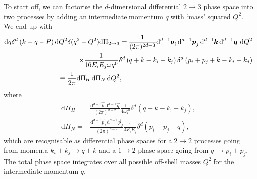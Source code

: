 \documentclass[../main.tex]{subfiles}
\begin{document}
To start off, we can factorise the \(d\)-dimensional differential \(2\to 3\) phase space into two processes by adding an intermediate momentum \(q\) with `mass' squared \(Q^2\).
We end up with
\begin{align}
  \label{pc:eq:dPi_factorised}
  \nonumber
  \mathrm{d}q \delta^d\pclosed{k+q-P} \mathrm{d}Q^2 \delta(q^2-Q^2) \mathrm{d}\Pi_{2\to 3} = \frac{1}{(2\pi)^{2d-3}}\mathrm{d}^{d-1}\vec{p}_i\,\mathrm{d}^{d-1}\vec{p}_j\,\mathrm{d}^{d-1}\vec{k}\,\mathrm{d}^{d-1}\vec{q}\,\,\mathrm{d}Q^2 \\
  \nonumber
  \times \frac{1}{16E_iE_j\omega q^0} \delta^d\pclosed{q+k - k_i-k_j}\delta^d\pclosed{p_i+p_j+k - k_i-k_j}                                                                                                                                  \\
  \equiv \frac{1}{2\pi} \mathrm{d}\Pi_H\, \mathrm{d}\Pi_N\, \mathrm{d}Q^2,\hspace{6.7cm}
\end{align}
where
\begin{subequations}
  \begin{align}
    \label{pc:eq:Pi_H}
    \mathrm{d}\Pi_H = & \frac{\mathrm{d}^{d-1}\vec{k}\, \mathrm{d}^{d-1}\vec{q}}{(2\pi)^{d-2}} \frac{1}{4\omega q^0} \delta^d(q+k-k_i-k_j), \\
    \label{pc:eq:Pi_N}
    \mathrm{d}\Pi_N = & \frac{\mathrm{d}^{d-1}\vec{p}_i\, \mathrm{d}^{d-1}\vec{p}_j}{(2\pi)^{d-2}} \frac{1}{4E_iE_j} \delta^d(p_i+p_j-q),
  \end{align}
\end{subequations}
which are recognisable as differential phase spaces for a \(2\to 2\) processes going from momenta \(k_i+k_j \to q+k\) and a \(1\to 2\) phase space going from \(q\ \to p_i+p_j\).
The total phase space integrates over all possible off-shell masses \(Q^2\) for the intermediate momentum \(q\).
\end{document}
